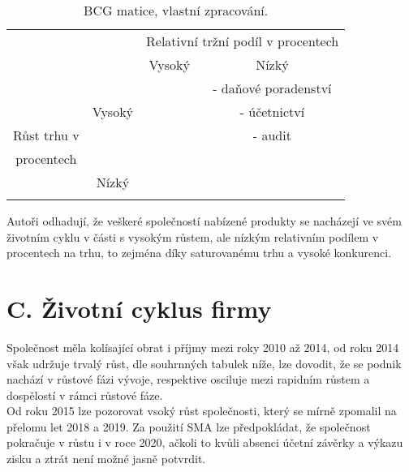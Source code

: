 \begin{table}[!hbtp]
\centering
\begin{tabular}{cc|cc|}
\cline{3-4}
\multicolumn{1}{l}{} & \multicolumn{1}{l|}{} & \multicolumn{2}{c|}{Relativní tržní podíl v procentech} \\ \cline{3-4} 
\multicolumn{1}{l}{} & \multicolumn{1}{l|}{} & \multicolumn{1}{c|}{Vysoký} & Nízký \\ \hline
\multicolumn{1}{|c|}{} &  & \multicolumn{1}{c|}{\cellcolor[HTML]{67FD9A}} & - daňové poradenství \\
\multicolumn{1}{|c|}{} & Vysoký & \multicolumn{1}{c|}{\cellcolor[HTML]{67FD9A}} & - účetnictví \\
\multicolumn{1}{|c|}{Růst trhu v} &  & \multicolumn{1}{c|}{\cellcolor[HTML]{67FD9A}} & - audit \\ \cline{2-4} 
\multicolumn{1}{|c|}{procentech} &  & \multicolumn{1}{c|}{} & \cellcolor[HTML]{FD6864}{\color[HTML]{000000} } \\
\multicolumn{1}{|c|}{} & Nízký & \multicolumn{1}{c|}{} & \cellcolor[HTML]{FD6864} \\
\multicolumn{1}{|c|}{} &  & \multicolumn{1}{c|}{} & \cellcolor[HTML]{FD6864} \\ \hline
\end{tabular}
\caption[BCG matice]{BCG matice, vlastní zpracování.}
\label{tab:BCG matice}
\end{table}

Autoři odhadují, že veškeré společností nabízené produkty se nacházejí ve svém životním cyklu v části s vysokým růstem, ale nízkým relativním podílem v procentech na trhu, to zejména díky saturovanému trhu a vysoké konkurenci.\\

\section*{C. Životní cyklus firmy}
\label{sec:Zivotni cyklus firmy}

Společnost měla kolísající obrat i příjmy mezi roky 2010 až 2014, od roku 2014 však udržuje trvalý růst, dle souhrnných tabulek níže, lze dovodit, že se podnik nachází v růstové fázi vývoje, respektive osciluje mezi rapidním růstem a dospělostí v rámci růstové fáze.\\

Od roku 2015 lze pozorovat vsoký růst společnosti, který se mírně zpomalil na přelomu let 2018 a 2019. Za použití SMA lze předpokládat, že společnost pokračuje v růstu i v roce 2020,  ačkoli to kvůli absenci účetní závěrky a výkazu zisku a ztrát není možné jasně potvrdit.\\


